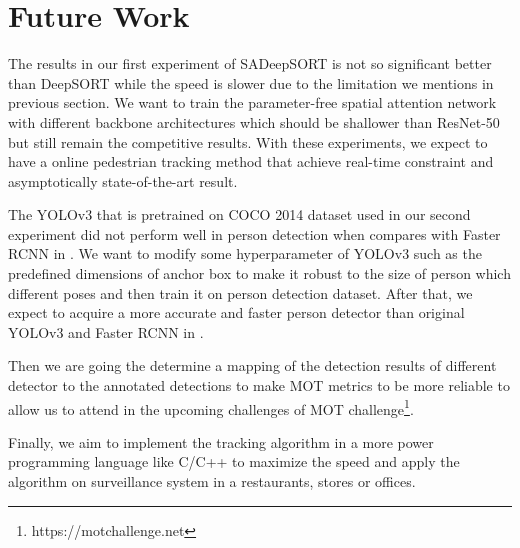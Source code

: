 \section{Future Work} 
\hspace{0.45cm} The results in our first experiment of SADeepSORT is not so significant better than DeepSORT\cite{Wojke2017simple} while
the speed is slower due to the limitation we mentions in previous section. We want to train the parameter-free spatial attention
network with different backbone architectures which should be shallower than ResNet-50\cite{He_2016_CVPR} but still remain the competitive results.
With these experiments, we expect to have a online pedestrian tracking method that achieve real-time constraint and asymptotically state-of-the-art result.\par 
The YOLOv3\cite{yolov3} that is pretrained on COCO 2014 dataset used in our second experiment did not perform well in person detection 
when compares with Faster \acrshort{RCNN} in \cite{Wojke2017simple}. We want to modify some hyperparameter of YOLOv3 such as the predefined dimensions of
anchor box to make it robust to the size of person which different poses and then train it on person detection dataset. After that,
we expect to acquire a more accurate and faster person detector than original YOLOv3\cite{yolov3} and Faster \acrshort{RCNN} in \cite{Wojke2017simple}.\par 
Then we are going the determine a mapping of the detection results of different detector to the annotated detections to make
MOT metrics\cite{Milan2016MOT16AB} to be more reliable to allow us to attend in the upcoming challenges of MOT challenge\footnote{https://motchallenge.net}.\par
Finally, we aim to implement the tracking algorithm in a more power programming language like C/C++ to maximize the speed and apply the algorithm
on surveillance system in a restaurants, stores or offices.